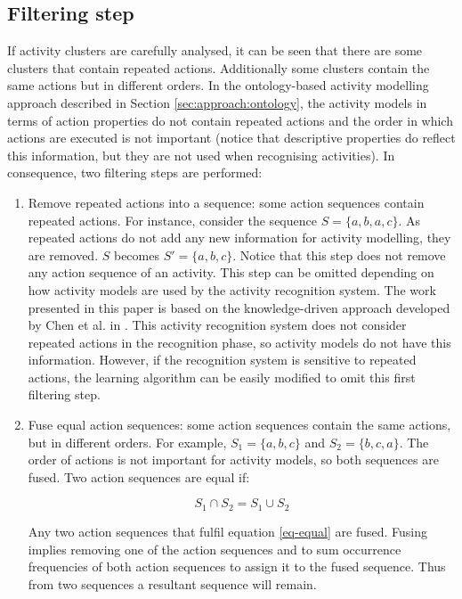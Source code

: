 \subsection{Filtering step}
\label{subsec:learner:filtering}

If activity clusters are carefully analysed, it can be seen that there are some clusters that contain repeated actions. Additionally some clusters contain the same actions but in different orders. In the ontology-based activity modelling approach described in Section \ref{sec:approach:ontology}, the activity models in terms of action properties do not contain repeated actions and the order in which actions are executed is not important (notice that descriptive properties do reflect this information, but they are not used when recognising activities). In consequence, two filtering steps are performed:

\begin{enumerate}
 \item Remove repeated actions into a sequence: some action sequences contain repeated actions. For instance, consider the sequence $S=\{a, b, a, c\}$. As repeated actions do not add any new information for activity modelling, they are removed. $S$ becomes $S' = \{a, b, c\}$. Notice that this step does not remove any action sequence of an activity. This step can be omitted depending on how activity models are used by the activity recognition system. The work presented in this paper is based on the knowledge-driven approach developed by Chen et al. in \cite{Chen2012a}. This activity recognition system does not consider repeated actions in the recognition phase, so activity models do not have this information. However, if the recognition system is sensitive to repeated actions, the learning algorithm can be easily modified to omit this first filtering step.
 
 \item Fuse equal action sequences: some action sequences contain the same actions, but in different orders. For example, $S_1 = \{a, b, c \}$ and $S_2 = \{b, c, a\}$. The order of actions is not important for activity models, so both sequences are fused. Two action sequences are equal if:
 
 \begin{equation}
 \label{eq-equal}
  S_1 \cap S_2 = S_1 \cup S_2
 \end{equation}

 Any two action sequences that fulfil equation \ref{eq-equal} are fused. Fusing implies removing one of the action sequences and to sum occurrence frequencies of both action sequences to assign it to the fused sequence. Thus from two sequences a resultant sequence will remain.

\end{enumerate}


